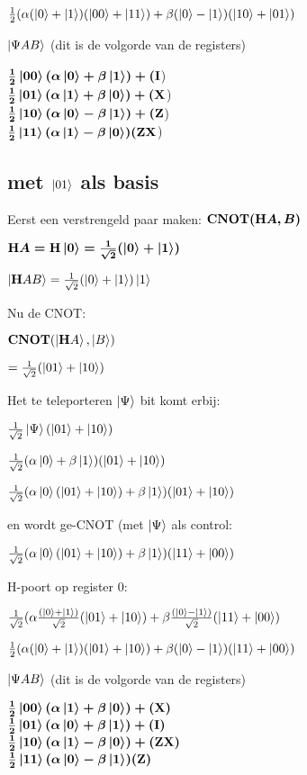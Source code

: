\documentclass[../main.tex]{subfiles}
\begin{document}
$ \frac{1}{2}(\alpha(\ket{0}+\ket{1})(\ket{00}+\ket{11})+\beta(\ket{0}-\ket{1})(\ket{10}+\ket{01})$

$\ket{\Psi A B}$ (dit is de volgorde van de registers)

$\frac{1}{2}\ket{00}(\alpha\ket{0}+\beta\ket{1})+ (\port{I}$)\\
$\frac{1}{2}\ket{01}(\alpha\ket{1}+\beta\ket{0})+ (\port{X}$)\\
$\frac{1}{2}\ket{10}(\alpha\ket{0}-\beta\ket{1})+ (\port{Z}$)\\
$\frac{1}{2}\ket{11}(\alpha\ket{1}-\beta\ket{0})  (\port{ZX}$)\\
\clearpage

\subsection*{met $\ket{01}$ als basis}
Eerst een verstrengeld paar maken: $\port{CNOT}(\port{H}A, B)$

$\port{H}A=\port{H}\ket{0}=\frac{1}{\sqrt{2}}(\ket{0}+\ket{1})$

$\ket{\port{H}A B}= \frac{1}{\sqrt{2}}(\ket{0}+\ket{1})\ket{1}$

Nu de CNOT:

$\port{CNOT}(\ket{\port{H}A},\ket{ B})$

$= \frac{1}{\sqrt{2}}(\ket{01}+\ket{10})$

Het te teleporteren $\ket{\Psi}$ bit komt erbij:

$ \frac{1}{\sqrt{2}}\ket{\Psi}(\ket{01}+\ket{10})$


$ \frac{1}{\sqrt{2}}(\alpha\ket{0}+\beta\ket{1})(\ket{01}+\ket{10})$


$ \frac{1}{\sqrt{2}}(\alpha\ket{0}(\ket{01}+\ket{10})+\beta\ket{1})(\ket{01}+\ket{10})$

en wordt ge-CNOT (met $\ket{\Psi}$ als control:

$ \frac{1}{\sqrt{2}}(\alpha\ket{0}(\ket{01}+\ket{10})+\beta\ket{1})(\ket{11}+\ket{00})$

H-poort op register 0:

$ \frac{1}{\sqrt{2}}(\alpha\frac{(\ket{0}+\ket{1})}{\sqrt{2}}(\ket{01}+\ket{10})+\beta\frac{(\ket{0}-\ket{1})}{\sqrt{2}}(\ket{11}+\ket{00})$


$ \frac{1}{2}(\alpha(\ket{0}+\ket{1})(\ket{01}+\ket{10})+\beta(\ket{0}-\ket{1})(\ket{11}+\ket{00})$

$\ket{\Psi A B}$ (dit is de volgorde van de registers)

$\frac{1}{2}\ket{00}(\alpha\ket{1}+\beta\ket{0})+ (\port{X})$\\
$\frac{1}{2}\ket{01}(\alpha\ket{0}+\beta\ket{1})+ (\port{I})$\\
$\frac{1}{2}\ket{10}(\alpha\ket{1}-\beta\ket{0})+ (\port{ZX})$\\
$\frac{1}{2}\ket{11}(\alpha\ket{0}-\beta\ket{1}) (\port{Z})$\\
\end{document}
